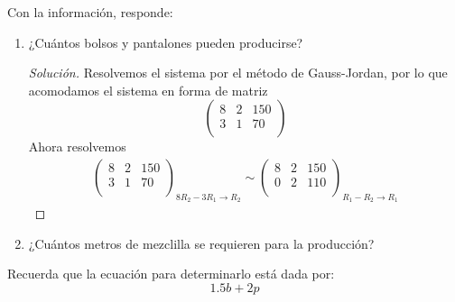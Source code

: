 \documentclass[12pt]{article}
\newenvironment{solution}{\begin{proof}[Solución]}{\end{proof}}
\begin{document}
\begin{enumerate}
    Con la información, responde: 
    \begin{enumerate}
        \item ¿Cuántos bolsos y pantalones pueden producirse?
        \begin{solution}
            Resolvemos el sistema por el método de Gauss-Jordan, por lo que acomodamos el sistema en forma de matriz \[\left(\begin{array}{cc|c}  
                8 & 2 & 150 \\  
                3 & 1 & 70  \\ 
            \end{array}\right)\] Ahora resolvemos \begin{gather*}
                \left(\begin{array}{cc|c}  
                    8 & 2 & 150 \\  
                    3 & 1 & 70  \\ 
                \end{array}\right)_{8R_2-3R_1 \rightarrow R_2} \sim \left(\begin{array}{cc|c}  
                    8 & 2 & 150 \\  
                    0 & 2 & 110  \\ 
                \end{array}\right)_{R_1-R_2 \rightarrow R_1}
            \end{gather*} 
        \end{solution}
        \item ¿Cuántos metros de mezclilla se requieren para la producción? 
    \end{enumerate}

    Recuerda que la ecuación para determinarlo está dada por: 
    \[1.5b + 2p\]
    

\end{enumerate}
\end{document}
